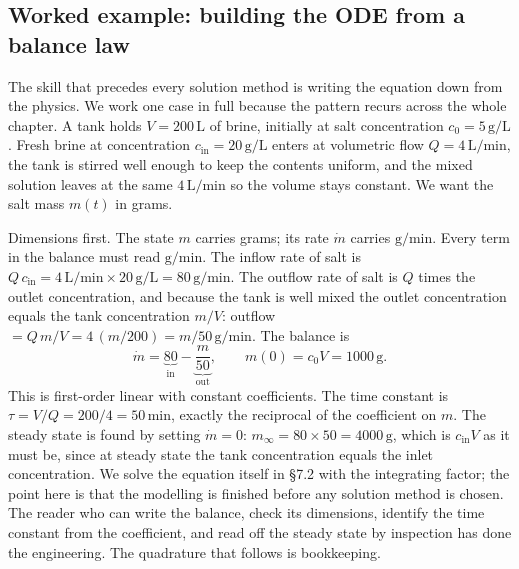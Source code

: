 \subsection{Worked example: building the ODE from a balance law}

The skill that precedes every solution method is writing the
equation down from the physics. We work one case in full because the
pattern recurs across the whole chapter. A tank holds
$V = 200\,\si{\liter}$ of brine, initially at salt concentration
$c_{0} = 5\,\si{\gram\per\liter}$. Fresh brine at concentration
$c_{\text{in}} = 20\,\si{\gram\per\liter}$ enters at volumetric flow
$Q = 4\,\si{\liter\per\minute}$, the tank is stirred well enough to
keep the contents uniform, and the mixed solution leaves at the same
$4\,\si{\liter\per\minute}$ so the volume stays constant. We want the
salt mass $m(t)$ in grams.

Dimensions first. The state $m$ carries grams; its rate $\dot{m}$
carries $\si{\gram\per\minute}$. Every term in the balance must
read $\si{\gram\per\minute}$. The inflow rate of salt is
$Q\, c_{\text{in}} = 4\,\si{\liter\per\minute} \times
20\,\si{\gram\per\liter} = 80\,\si{\gram\per\minute}$. The outflow
rate of salt is $Q$ times the outlet concentration, and because the
tank is well mixed the outlet concentration equals the tank
concentration $m/V$: outflow $= Q\, m/V =
4\,(m/200) = m/50\,\si{\gram\per\minute}$. The balance is
\[
\dot{m} = \underbrace{80}_{\text{in}} - \underbrace{\frac{m}{50}}_{\text{out}}, \qquad m(0) = c_{0} V = 1000\,\si{\gram}.
\]
This is first-order linear with constant coefficients. The time
constant is $\tau = V/Q = 200/4 = 50\,\si{\minute}$, exactly the
reciprocal of the coefficient on $m$. The steady state is found by
setting $\dot{m} = 0$: $m_{\infty} = 80 \times 50 = 4000\,\si{\gram}$,
which is $c_{\text{in}} V$ as it must be, since at steady state the
tank concentration equals the inlet concentration. We solve the
equation itself in \S7.2 with the integrating factor; the point here
is that the modelling is finished before any solution method is
chosen. The reader who can write the balance, check its dimensions,
identify the time constant from the coefficient, and read off the
steady state by inspection has done the engineering. The quadrature
that follows is bookkeeping.

